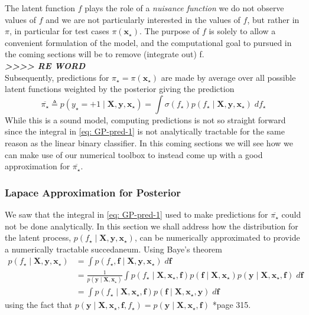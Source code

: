 The latent function $f$ plays the role of a {\it nuisance function} we do not observe values of $f$ and we are not particularly interested in the values of $f$, but rather in $\pi$, in particular for test cases $\pi \left( \bm{x}_{\star} \right)$. The purpose of $f$ is solely to allow a convenient formulation of the model, and the computational goal to pursued in the coming sections will be to remove (integrate out) f.\\
{\em \textbf{>>>> RE WORD}}\\
Subsequently, predictions for $\pi_{\star} = \pi \left( \bm{x}_{\star} \right)$ are made by average over all possible latent functions weighted by the posterior giving the prediction
\begin{equation} \label{eq: GP-pred-1}
    \overline{\pi_{\star}} \triangleq p \left( y_{\star} = +1 \mid \bm{X} , \bm{y} , \bm{x}_{\star} \right) = \int \sigma \left( f_{\star} \right) p \left( f_{\star} \mid \bm{X} , \bm{y} , \bm{x}_{\star} \right) \; d f_{\star}
\end{equation}
While this is a sound model, computing predictions is not so straight forward since the integral in \ref{eq: GP-pred-1} is not analytically tractable for the same reason as the linear binary classifier. In this coming sections we will see how we can make use of our numerical toolbox to instead come up with a good approximation for $\overline{\pi_{\star}}$.

\subsubsection{Lapace Approximation for Posterior}\label{Section1.6.2}

We saw that the integral in \ref{eq: GP-pred-1} used to make predictions for $\overline{\pi_{\star}}$ could not be done analytically. In this section we shall address how the distribution for the latent process, $p \left( f_{\star} \mid \bm{X} , \bm{y} , \bm{x}_{\star} \right)$, can be numerically approximated to provide a numerically tractable succedaneum. Using Baye's theorem
\begin{align*}
    p \left( f_{\star} \mid \bm{X} , \bm{y} , \bm{x}_{\star} \right)
     & = \int p \left( f_{\star} , \bm{f} \mid \bm{X} , \bm{y} , \bm{x}_{\star} \right) \; d \bm{f}                                                                                                                                                                        \\
     & = \frac{1}{p \left( \bm{y} \mid \bm{X} , \bm{x}_{\star} \right)} \int p \left( f_{\star} \mid \bm{X} , \bm{x}_{\star}, \bm{f} \right) p \left( \bm{f} \mid \bm{X} , \bm{x}_{\star} \right) p \left( \bm{y} \mid \bm{X} , \bm{x}_{\star}, \bm{f} \right) \; d \bm{f} \\
     & = \int p \left( f_{\star} \mid \bm{X} , \bm{x}_{\star}, \bm{f} \right) p \left( \bm{f} \mid \bm{X} , \bm{x}_{\star}, \bm{y} \right) \; d \bm{f}
\end{align*}
using the fact that $p \left( \bm{y} \mid \bm{X} , \bm{x}_{\star}, \bm{f}, f_{\star} \right) = p \left( \bm{y} \mid \bm{X} , \bm{x}_{\star}, \bm{f} \right)$ \cite{BishopChristopherM2006Pram}*{page 315}.